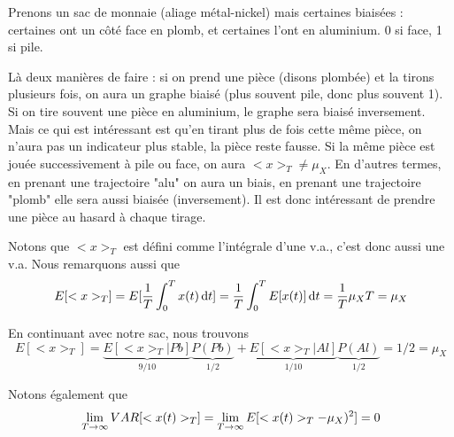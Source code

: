 \documentclass[11pt,a4paper]{article}
\numberwithin{equation}{section}
\begin{document}
\begin{exemple}
    Prenons un sac de monnaie (aliage métal-nickel) mais certaines biaisées : certaines ont un côté face en plomb, et certaines l'ont en aluminium. 0 si face, 1 si pile. 
    
    Là deux manières de faire : si on prend une pièce (disons plombée) et la tirons plusieurs fois, on aura un graphe biaisé (plus souvent pile, donc plus souvent 1). Si on tire souvent une pièce en aluminium, le graphe sera biaisé inversement. Mais ce qui est intéressant est qu'en tirant plus de fois cette même pièce, on n'aura pas un indicateur plus stable, la pièce reste fausse. Si la même pièce est jouée successivement à pile ou face, on aura $<x>_T \neq \mu_X$. En d'autres termes, en prenant une trajectoire "alu" on aura un biais, en prenant une trajectoire "plomb" elle sera aussi biaisée (inversement). Il est donc intéressant de prendre une pièce au hasard à chaque tirage.
\end{exemple}

Notons que $<x>_T$ est défini comme l'intégrale d'une v.a., c'est donc aussi une v.a. Nous remarquons aussi que 
\[E[<x>_T] = E[\frac{1}{T}\int_0^T x(t)\, \mathrm d t] = \frac{1}{T}\int_0^T E[x(t)] \, \mathrm d t = \frac{1}{T}\mu_X T = \mu_X\]

 \begin{suiteExemple}
    En continuant avec notre sac, nous trouvons 
    \[E[<x>_T] = \underbrace{E[<x>_T|Pb]}_{9/10}\underbrace{P(Pb)}_{1/2} + \underbrace{E[<x>_T|Al]}_{1/10} \underbrace{P(Al)}_{1/2} = 1/2 = \mu_X\]
\end{suiteExemple}
Notons également que 
\[\lim\limits_{T\to\infty} VAR[<x(t)>_T] = \lim\limits_{T\to\infty}E[<x(t)>_T - \mu_X)^2] = 0\]

\end{document}
